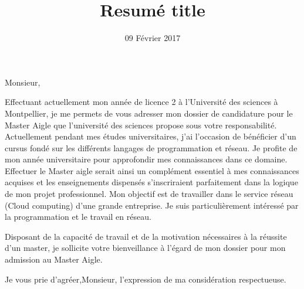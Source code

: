 \documentclass[11pt,a4paper,sans]{moderncv}        %
\title{Resumé title}                               %
\begin{document}
\date{09 Février 2017}
\opening{Monsieur,}
\closing{}
\makelettertitle

Effectuant actuellement mon ann\'ee de licence 2 à l’Universit\'e des sciences à Montpellier, je me permets de vous adresser mon dossier de candidature pour le Master Aigle que l’universit\'e des sciences propose sous votre responsabilit\'e.
Actuellement pendant mes études universitaires, j’ai  l’occasion de b\'en\'eficier d’un cursus fond\'e sur les différents langages de programmation et
r\'eseau.
Je profite de mon ann\'ee universitaire  pour approfondir mes connaissances dans ce domaine. 
Effectuer le Master aigle serait ainsi un compl\'ement essentiel à mes connaissances acquises et
les enseignements dispens\'es s’inscriraient parfaitement
dans la logique de mon projet professionnel. Mon objectif est de travailler dans le service réseau (Cloud computing) d’une grande entreprise.
Je suis particulièrement int\'eress\'e par la programmation et le travail en réseau.

Disposant de la capacit\'e de travail et de la motivation n\'ecessaires à la r\'eussite d’un master,
je sollicite votre bienveillance à l’\'egard de mon dossier pour mon admission au Master Aigle.

Je vous prie d’agr\'eer,Monsieur, l’expression de ma consid\'eration respectueuse.


\makeletterclosing
\end{document}
